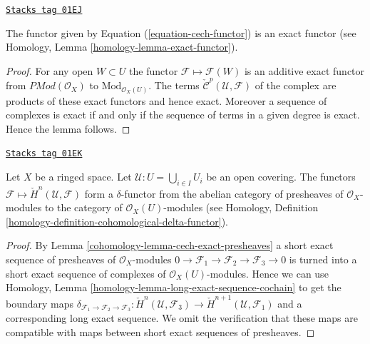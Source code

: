 \begin{lemma}
\label{cohomology-lemma-cech-exact-presheaves}
\href{https://stacks.math.columbia.edu/tag/01EJ}{\texttt{Stacks tag 01EJ}}

The functor given by Equation (\ref{equation-cech-functor})
is an exact functor (see Homology, Lemma \ref{homology-lemma-exact-functor}).
\end{lemma}

\begin{proof}
For any open $W \subset U$ the functor
$\mathcal{F} \mapsto \mathcal{F}(W)$ is an additive exact functor
from $\textit{PMod}(\mathcal{O}_X)$ to $\text{Mod}_{\mathcal{O}_X(U)}$.
The terms
$\check{\mathcal{C}}^p(\mathcal{U}, \mathcal{F})$
of the complex are products of these exact functors and hence exact.
Moreover a sequence of complexes is exact if and only if the sequence
of terms in a given degree is exact. Hence the lemma follows.
\end{proof}

\begin{lemma}
\label{cohomology-lemma-cech-cohomology-delta-functor-presheaves}
\href{https://stacks.math.columbia.edu/tag/01EK}{\texttt{Stacks tag 01EK}}

Let $X$ be a ringed space.
Let $\mathcal{U} : U = \bigcup_{i \in I} U_i$ be an open covering.
The functors $\mathcal{F} \mapsto \check{H}^n(\mathcal{U}, \mathcal{F})$
form a $\delta$-functor from the abelian category of
presheaves of $\mathcal{O}_X$-modules to the category
of $\mathcal{O}_X(U)$-modules (see
Homology, Definition \ref{homology-definition-cohomological-delta-functor}).
\end{lemma}

\begin{proof}

By
Lemma \ref{cohomology-lemma-cech-exact-presheaves}
a short exact sequence of presheaves of
$\mathcal{O}_X$-modules
$0 \to \mathcal{F}_1 \to \mathcal{F}_2 \to \mathcal{F}_3 \to 0$
is turned into a short exact sequence of complexes of
$\mathcal{O}_X(U)$-modules. Hence we can use
Homology, Lemma \ref{homology-lemma-long-exact-sequence-cochain}
to get the boundary maps
$\delta_{\mathcal{F}_1 \to \mathcal{F}_2 \to \mathcal{F}_3} :
\check{H}^n(\mathcal{U}, \mathcal{F}_3) \to
\check{H}^{n + 1}(\mathcal{U}, \mathcal{F}_1)$
and a corresponding long exact sequence. We omit the verification
that these maps are compatible with maps between short exact
sequences of presheaves.
\end{proof}



